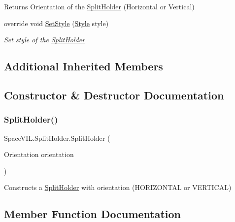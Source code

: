 \begin{DoxyCompactItemize}
\begin{DoxyCompactList}
\begin{DoxyReturn}{Returns}
Orientation of the \mbox{\hyperlink{class_space_v_i_l_1_1_split_holder}{Split\+Holder}} (Horizontal or Vertical) 
\end{DoxyReturn}
\end{DoxyCompactList}\item 
override void \mbox{\hyperlink{class_space_v_i_l_1_1_split_holder_a0489f7db33f2310761600b11ea308c40}{Set\+Style}} (\mbox{\hyperlink{class_space_v_i_l_1_1_decorations_1_1_style}{Style}} style)
\begin{DoxyCompactList}\small\item\em Set style of the \mbox{\hyperlink{class_space_v_i_l_1_1_split_holder}{Split\+Holder}} \end{DoxyCompactList}\end{DoxyCompactItemize}
\subsection*{Additional Inherited Members}


\subsection{Constructor \& Destructor Documentation}
\mbox{\label{class_space_v_i_l_1_1_split_holder_ae6b6eb9d5aaec2d342060ff43161c828}} 
\subsubsection{\texorpdfstring{Split\+Holder()}{SplitHolder()}}
{\footnotesize\ttfamily Space\+V\+I\+L.\+Split\+Holder.\+Split\+Holder (\begin{DoxyParamCaption}\item[{Orientation}]{orientation }\end{DoxyParamCaption})}



Constructs a \mbox{\hyperlink{class_space_v_i_l_1_1_split_holder}{Split\+Holder}} with orientation (H\+O\+R\+I\+Z\+O\+N\+T\+AL or V\+E\+R\+T\+I\+C\+AL) 



\subsection{Member Function Documentation}
\mbox{\label{class_space_v_i_l_1_1_split_holder_a62cde28681c0be51120e07724db4486b}} 
